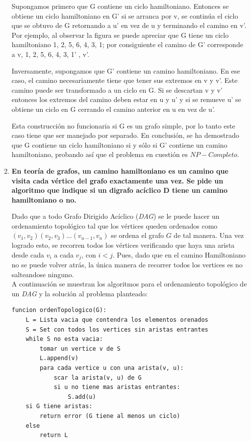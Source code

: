 \documentclass{article}
\newcommand\tab[1][0.5cm]{\hspace*{#1}}
\begin{document}
\begin{enumerate}
             \tab Supongamos primero que G contiene un ciclo hamiltoniano. Entonces se obtiene un ciclo hamiltoniano en G’ si se arranca por v,
             se continúa el ciclo que se obtuvo de G retornando a u’ en vez de u  y terminando el camino en v’. Por ejemplo, al observar la
             figura se puede apreciar que G tiene un ciclo hamiltoniano 1, 2, 5, 6, 4, 3, 1; por consiguiente el camino de G’ corresponde
             a v, 1, 2, 5, 6, 4, 3, 1’ , v’.

             \tab Inversamente, supongamos que G’ contiene un camino hamiltoniano. En ese caso, el camino necesariamente tiene que tener sus
             extremos en v y v’. Este camino puede ser transformado a un ciclo en G. Si se descartan v y v’ entonces los extremos del camino
             deben estar en u y u’ y si se remueve u’ se obtiene un ciclo en G cerrando el camino anterior en u en vez de u’.

             \tab Esta construcción no funcionaria si G es un grafo simple, por lo tanto este caso tiene que ser manejado por separado. En conclusión,
             se ha demostrado que G contiene un ciclo hamiltoniano si y sólo si G’ contiene un camino hamiltoniano, probando así que el problema en
             cuestión es $NP-Completo$.

        \item \textbf{En teoría de grafos, un camino hamiltoniano es un camino que visita cada vértice del grafo exactamente
            una vez. Se pide un algoritmo que indique si un digrafo acíclico D tiene un camino hamiltoniano o no.} %

            \tab Dado que a todo Grafo Dirigido Acíclico (\emph{DAG}) se le puede hacer un ordenamiento topológico tal que los
            vértices queden ordenados como $(v_{1}, v_{2})(v_{2},v_{3})...(v_{n-1}, v_{n})$ se ordena el grafo $G$ de tal manera.
            Una vez logrado esto, se recorren todos los vértices verificando que haya una arista desde cada $v_{i}$ a cada $v_{j}$,
            con $i < j$. Pues, dado que en el camino Hamiltoniano no se puede volver atrás, la única manera de recorrer todos los vertices
            es no salteandose ninguno. \\
            \tab A continuación se muestran los algoritmos para el ordenamiento topológico de un \emph{DAG} y la solución
            al problema planteado:
            \begin{lstlisting}
funcion ordenTopologico(G):
    L = Lista vacia que contendra los elementos orenados
    S = Set con todos los vertices sin aristas entrantes
    while S no esta vacia:
        tomar un vertice v de S
        L.append(v)
        para cada vertice u con una arista(v, u):
            scar la arista(v, u) de G
            si u no tiene mas aristas entrantes:
                S.add(u)
    si G tiene aristas:
        return error (G tiene al menos un ciclo)
    else
        return L


\end{lstlisting}
\end{enumerate}
\end{document}
